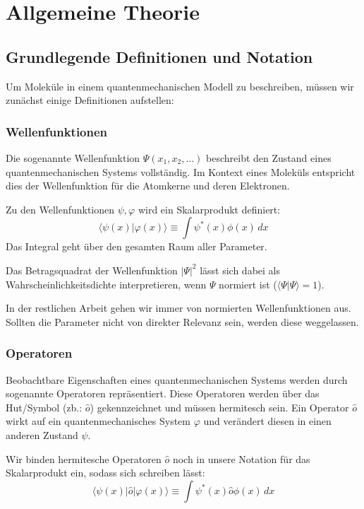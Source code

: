 \section{Allgemeine Theorie}

\subsection{Grundlegende Definitionen und Notation}
Um Moleküle in einem quantenmechanischen Modell zu beschreiben,
müssen wir zunächst einige Definitionen aufstellen:

\subsubsection{Wellenfunktionen}
Die sogenannte Wellenfunktion $\Psi(x_1, x_2, \dots)$ 
beschreibt den Zustand eines quantenmechanischen Systems vollständig.
Im Kontext eines Moleküls entspricht dies der Wellenfunktion für die Atomkerne
und deren Elektronen.

Zu den Wellenfunktionen $\psi, \varphi$ wird ein Skalarprodukt definiert:
\begin{equation}
    \langle \psi(x) \vert \varphi(x) \rangle \equiv  \int \psi^*(x) \phi(x) \,dx
\end{equation}
Das Integral geht über den gesamten Raum aller Parameter.

Das Betragsquadrat der Wellenfunktion $\vert \Psi \vert^2$
lässt sich dabei als Wahrscheinlichkeitsdichte interpretieren, wenn $\Psi$ normiert ist
($\langle \Psi \vert \Psi \rangle = 1$).

\cite[S. 20-21, 24]{atkins_friedman_2011}

In der restlichen Arbeit gehen wir immer von normierten Wellenfunktionen aus.
Sollten die Parameter nicht von direkter Relevanz sein, werden diese weggelassen.

\subsubsection{Operatoren}
Beobachtbare Eigenschaften eines quantenmechanischen Systems 
werden durch sogenannte Operatoren repräsentiert.
Diese Operatoren werden über das Hut\-/Symbol (zb.: $\hat{o}$) gekennzeichnet
und müssen hermitesch sein.
Ein Operator $\hat{o}$ wirkt auf ein quantenmechanisches System $\varphi$
und verändert diesen in einen anderen Zustand $\psi$.

Wir binden hermitesche Operatoren $\hat{o}$ noch in unsere Notation für das Skalarprodukt ein,
sodass sich schreiben lässt:
\begin{equation}
    \langle \psi(x) \vert \hat{o} \vert \varphi(x) \rangle \equiv  \int \psi^*(x) \hat{o} \phi(x) \,dx
\end{equation}

